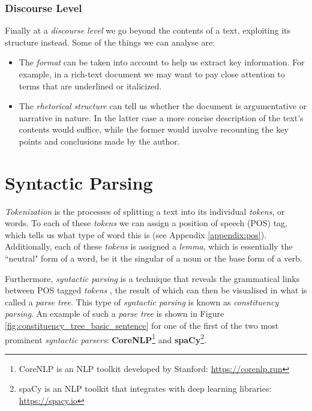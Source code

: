\subsubsection*{Discourse Level}

Finally at a \textit{discourse level} we go beyond the contents of a text, exploiting its structure instead. Some of the things we can analyse are:

\begin{itemize}
\item The \textit{format} can be taken into account to help us extract key information. For example, in a rich-text document we may want to pay close attention to terms that are underlined or italicized.
\item The \textit{rhetorical structure} can tell us whether the document is argumentative or narrative in nature. In the latter case a more concise description of the text's contents would suffice, while the former would involve recounting the key points and conclusions made by the author.
\end{itemize}

\section{Syntactic Parsing}
\label{sec:syntactic_parsing}

\textit{Tokenization} is the processes of splitting a text into its individual \textit{tokens}, or words. To each of these \textit{tokens} we can assign a position of speech (POS) tag, which tells us what type of word this is (see Appendix \ref{appendix:pos}). Additionally, each of these \textit{tokens} is assigned a \textit{lemma}, which is essentially the ``neutral" form of a word, be it the singular of a noun or the base form of a verb.

Furthermore, \textit{syntactic parsing} is a technique that reveals the grammatical links between POS tagged \textit{tokens} \cite{noauthor_syntactic_nodate}, the result of which can then be visualised in what is called a \textit{parse tree}. This type of \textit{syntactic parsing} is known as \textit{constituency parsing}. An example of such a \textit{parse tree} is shown in Figure \ref{fig:constituency_tree_basic_sentence} for one of the first of the two most prominent \textit{syntactic parsers}: \textbf{CoreNLP}\footnote{CoreNLP is an NLP toolkit developed by Stanford: \url{https://corenlp.run}} and \textbf{spaCy}\footnote{spaCy is an NLP toolkit that integrates with deep learning libraries: \url{https://spacy.io}}.

